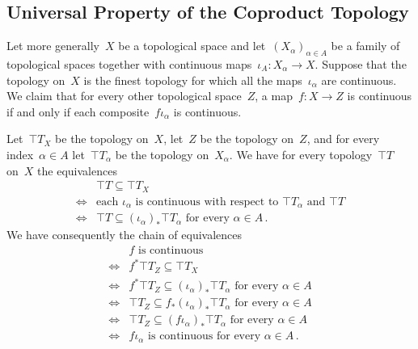 \subsection{Universal Property of the Coproduct Topology}

Let more generally~$X$ be a topological space and let~$(X_α)_{α ∈ A}$ be a family of topological spaces together with continuous maps~$ι_A \colon X_α \to X$.
Suppose that the topology on~$X$ is the finest topology for which all the maps~$ι_α$ are continuous.
We claim that for every other topological space~$Z$, a map~$f \colon X \to Z$ is continuous if and only if each composite~$f ι_α$ is continuous.

Let~$\top{T}_X$ be the topology on~$X$, let~$Z$ be the topology on~$Z$, and for every index~$α ∈ A$ let~$\top{T}_α$ be the topology on~$X_α$.
We have for every topology~$\top{T}$ on~$X$ the equivalences
\begin{align*}
	{}&
	\top{T} ⊆ \top{T}_X
	\\
	\iff{}&
	\text{each~$ι_α$ is continuous with respect to~$\top{T}_α$ and~$\top{T}$}
	\\
	\iff{}&
	\text{$\top{T} ⊆ (ι_α)_* \top{T}_α$ for every~$α ∈ A$} \,.
\end{align*}
We have consequently the chain of equivalences
\begin{align*}
	{}&
	\text{$f$ is continuous}
	\\
	\iff{}&
	f^* \top{T}_Z ⊆ \top{T}_X
	\\
	\iff{}&
	\text{$f^* \top{T}_Z ⊆ (ι_α)_* \top{T}_α$ for every~$α ∈ A$}
	\\
	\iff{}&
	\text{$\top{T}_Z ⊆ f_* (ι_α)_* \top{T}_α$ for every~$α ∈ A$}
	\\
	\iff{}&
	\text{$\top{T}_Z ⊆ (f ι_α)_* \top{T}_α$ for every~$α ∈ A$}
	\\
	\iff{}&
	\text{$f ι_α$ is continuous for every~$α ∈ A$} \,.
\end{align*}
